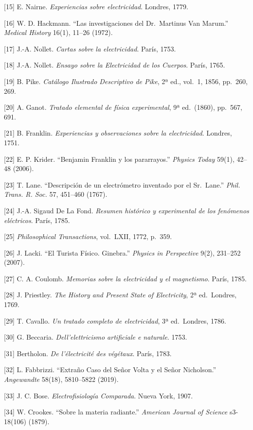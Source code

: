 \documentclass[
]{article}
\begin{document}
{[}15{]} E. Nairne. \emph{Experiencias sobre electricidad}. Londres,
1779.

{[}16{]} W. D. Hackmann. ``Las investigaciones del Dr.~Martinus Van
Marum.'' \emph{Medical History} 16(1), 11--26 (1972).

{[}17{]} J.-A. Nollet. \emph{Cartas sobre la electricidad}. París, 1753.

{[}18{]} J.-A. Nollet. \emph{Ensayo sobre la Electricidad de los
Cuerpos}. París, 1765.

{[}19{]} B. Pike. \emph{Catálogo Ilustrado Descriptivo de Pike}, 2ª ed.,
vol.~1, 1856, pp.~260, 269.

{[}20{]} A. Ganot. \emph{Tratado elemental de física experimental}, 9ª
ed.~(1860), pp.~567, 691.

{[}21{]} B. Franklin. \emph{Experiencias y observaciones sobre la
electricidad}. Londres, 1751.

{[}22{]} E. P. Krider. ``Benjamin Franklin y los pararrayos.''
\emph{Physics Today} 59(1), 42--48 (2006).

{[}23{]} T. Lane. ``Descripción de un electrómetro inventado por el
Sr.~Lane.'' \emph{Phil. Trans. R. Soc.} 57, 451--460 (1767).

{[}24{]} J.-A. Sigaud De La Fond. \emph{Resumen histórico y experimental
de los fenómenos eléctricos}. París, 1785.

{[}25{]} \emph{Philosophical Transactions}, vol.~LXII, 1772, p.~359.

{[}26{]} J. Lacki. ``El Turista Físico. Ginebra.'' \emph{Physics in
Perspective} 9(2), 231--252 (2007).

{[}27{]} C. A. Coulomb. \emph{Memorias sobre la electricidad y el
magnetismo}. París, 1785.

{[}28{]} J. Priestley. \emph{The History and Present State of
Electricity}, 2ª ed.~Londres, 1769.

{[}29{]} T. Cavallo. \emph{Un tratado completo de electricidad}, 3ª
ed.~Londres, 1786.

{[}30{]} G. Beccaria. \emph{Dell'elettricismo artificiale e naturale}.
1753.

{[}31{]} Bertholon. \emph{De l'électricité des végétaux}. París, 1783.

{[}32{]} L. Fabbrizzi. ``Extraño Caso del Señor Volta y el Señor
Nicholson.'' \emph{Angewandte} 58(18), 5810--5822 (2019).

{[}33{]} J. C. Bose. \emph{Electrofisiología Comparada}. Nueva York,
1907.

{[}34{]} W. Crookes. ``Sobre la materia radiante.'' \emph{American
Journal of Science} s3-18(106) (1879).
\end{document}
